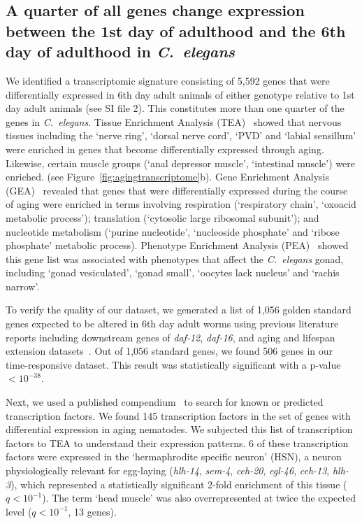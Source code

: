 \documentclass[9pt,twocolumn,twoside]{gsag3jnl}
\newcommand{\cel}{\emph{C.~elegans}}
\newcommand{\gene}[1]{\emph{\mbox{#1}}}
\newcommand{\agen}{5,592}
\newcommand{\tfaging}{145}
\newcommand{\goldn}{1,056}
\newcommand{\goldfound}{506}
\newcommand{\goldpval}{$<10^{-38}$}
\begin{document}
\subsection*{A quarter of all genes change expression between the 1st day of
             adulthood and the 6th day of adulthood in \cel{}}
We identified a transcriptomic signature consisting of \agen{} genes that were
differentially expressed in 6th day adult animals of either genotype relative to
1st day adult animals (see SI file 2). This constitutes more than one quarter of
the genes in \cel{}. Tissue Enrichment Analysis
(TEA)~\citep{Angeles-Albores2016} showed that nervous tissues including the
`nerve ring', `dorsal nerve cord', `PVD' and `labial sensillum' were enriched in
genes that become differentially expressed through aging. Likewise, certain
muscle groups (`anal depressor muscle', `intestinal muscle') were enriched. (see
Figure~\ref{fig:agingtranscriptome}b). Gene Enrichment Analysis
(GEA)~\citep{Angeles-Albores106369} revealed that genes that were differentially
expressed during the course of aging were enriched in terms involving
respiration (`respiratory chain', `oxoacid metabolic process'); translation
(`cytosolic large ribosomal subunit'); and nucleotide metabolism (`purine
nucleotide', `nucleoside phosphate' and `ribose phosphate' metabolic process).
Phenotype Enrichment Analysis (PEA)~\citep{Angeles-Albores106369} showed this
gene list was associated with phenotypes that affect the \cel{} gonad, including
`gonad vesiculated', `gonad small', `oocytes lack nucleus' and `rachis narrow'.

To verify the quality of our dataset, we generated a list of \goldn{} golden
standard genes expected to be altered in 6th day adult worms using previous
literature reports including downstream genes of \gene{daf-12}, \gene{daf-16},
and aging and lifespan extension datasets~\citep{Murphy2003,
Halaschek-wiener2005,Lund2002,McCormick2012,Eckley2013}. Out of \goldn{}
standard genes, we found \goldfound{} genes in our time-responsive dataset. This
result was statistically significant with a p-value \goldpval{}.

Next, we used a published compendium~\citep{Reece-Hoyes2005} to search for known
or predicted transcription factors. We found \tfaging{} transcription factors in
the set of genes with differential expression in aging nematodes. We subjected
this list of transcription factors to TEA to understand their expression
patterns. 6 of these transcription factors were expressed in the `hermaphrodite
specific neuron' (HSN), a neuron physiologically relevant for egg-laying
(\gene{hlh-14}, \gene{sem-4}, \gene{ceh-20}, \gene{egl-46}, \gene{ceh-13},
\gene{hlh-3}), which represented a statistically significant 2-fold enrichment
of this tissue ($q<10^{-1}$). The term `head muscle' was also overrepresented at
twice the expected level ($q<10^{-1}$, 13 genes).
\end{document}
